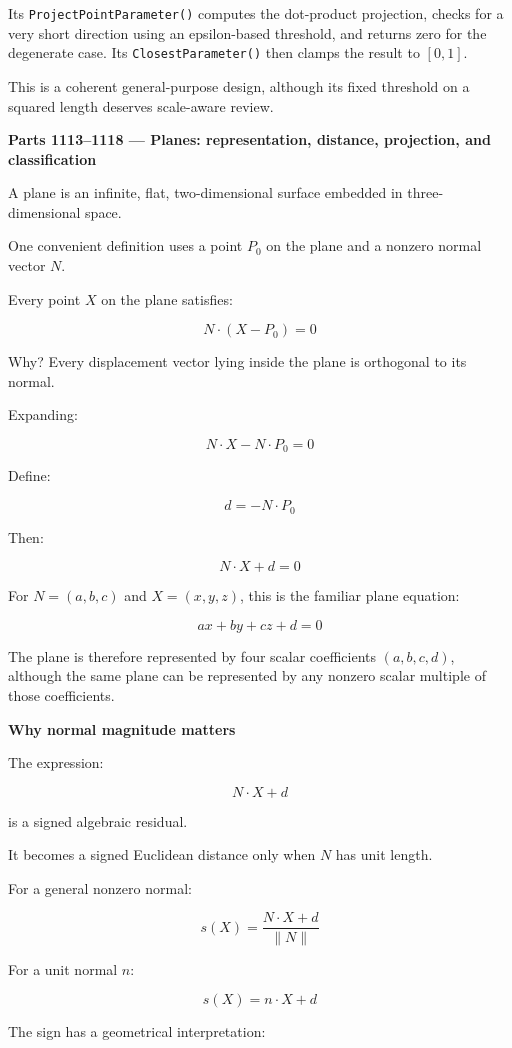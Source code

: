 Its \texttt{ProjectPointParameter()} computes the dot-product projection, checks for a very short direction using an epsilon-based threshold, and returns zero for the degenerate case. Its \texttt{ClosestParameter()} then clamps the result to \([0,1]\).

This is a coherent general-purpose design, although its fixed threshold on a squared length deserves scale-aware review.

\textbf{Parts 1113--1118 --- Planes: representation, distance, projection, and classification}

A plane is an infinite, flat, two-dimensional surface embedded in three-dimensional space.

One convenient definition uses a point \(P_0\) on the plane and a nonzero normal vector \(N\).

Every point \(X\) on the plane satisfies:

\[
\boxed{N\cdot(X-P_0)=0}
\]

Why? Every displacement vector lying inside the plane is orthogonal to its normal.

Expanding:

\[
N\cdot X-N\cdot P_0=0
\]

Define:

\[
d=-N\cdot P_0
\]

Then:

\[
\boxed{N\cdot X+d=0}
\]

For \(N=(a,b,c)\) and \(X=(x,y,z)\), this is the familiar plane equation:

\[
ax+by+cz+d=0
\]

The plane is therefore represented by four scalar coefficients \((a,b,c,d)\), although the same plane can be represented by any nonzero scalar multiple of those coefficients.

\textbf{Why normal magnitude matters}

The expression:

\[
N\cdot X+d
\]

is a signed algebraic residual.

It becomes a signed Euclidean distance only when \(N\) has unit length.

For a general nonzero normal:

\[
\boxed{ s(X)=\frac{N\cdot X+d}{\|N\|} }
\]

For a unit normal \(n\):

\[
\boxed{s(X)=n\cdot X+d}
\]

The sign has a geometrical interpretation:

